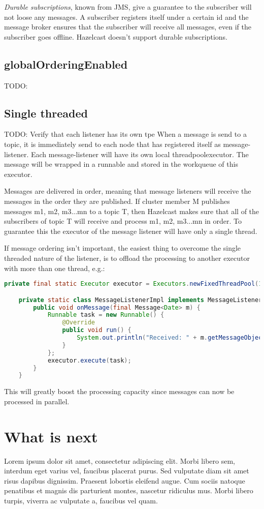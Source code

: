 \emph{Durable subscriptions}, known from JMS, give a guarantee to the subscriber will not loose any messages. A subscriber registers itself under a certain id and the message broker ensures that the subscriber will receive all messages, even if the subscriber goes offline. Hazelcast doesn't support durable subscriptions.

\subsection{globalOrderingEnabled}
TODO:

\subsection{Single threaded}
TODO: Verify that each listener has its own tpe
When a message is send to a topic, it is immediately send to each node that has registered itself as message-listener. Each message-listener will have its own local threadpoolexecutor. The message will be wrapped in a runnable and stored in the workqueue of this executor.

Messages are delivered in order, meaning that message listeners will receive the messages in the order they are published. If cluster member M publishes messages m1, m2, m3...mn to a topic T, then Hazelcast makes sure that all of the subscribers of topic T will receive and process m1, m2, m3...mn in order. To guarantee this the executor of the message listener will have only a single thread.

If message ordering isn't important, the easiest thing to overcome the single threaded nature of the listener, is to offload the processing to another executor with more than one thread, e.g.:
\begin{lstlisting}[language=java]
    private final static Executor executor = Executors.newFixedThreadPool(10);       

    private static class MessageListenerImpl implements MessageListener<Date> {
        public void onMessage(final Message<Date> m) {
            Runnable task = new Runnable() {
                @Override
                public void run() {
                    System.out.println("Received: " + m.getMessageObject());
                }
            };
            executor.execute(task);
        }
    } 
\end{lstlisting}
This will greatly boost the processing capacity since messages can now be processed in parallel.

\section{What is next}
Lorem ipsum dolor sit amet, consectetur adipiscing elit. Morbi libero sem,
interdum eget varius vel, faucibus placerat purus. Sed vulputate diam sit amet
risus dapibus dignissim. Praesent lobortis eleifend augue. Cum sociis natoque
penatibus et magnis dis parturient montes, nascetur ridiculus mus. Morbi libero
turpis, viverra ac vulputate a, faucibus vel quam.

